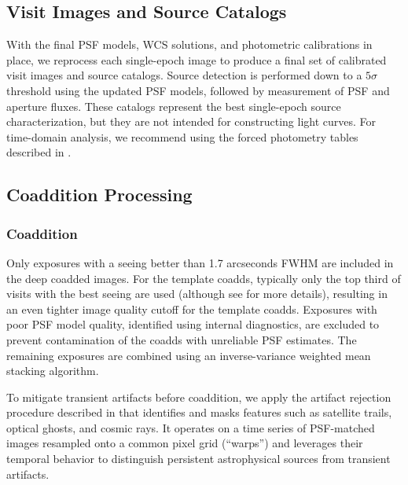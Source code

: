 \subsection{Visit Images and Source Catalogs}
\label{sssec:visit_images_source_catalogs}
With the final \gls{PSF} models, \gls{WCS} solutions, and photometric calibrations in place, we reprocess each single-epoch image to produce a final set of calibrated visit images and source catalogs.
Source detection is performed down to a $5\sigma$ threshold using the updated \gls{PSF} models, followed by measurement of \gls{PSF} and aperture fluxes.
These catalogs represent the best single-\gls{epoch} source characterization, but they are not intended for constructing light curves.
For time-domain analysis, we recommend using the \gls{forced photometry} tables described in .

\subsection{Coaddition Processing}
\label{ssec:coadd_processing}
\subsubsection{Coaddition}
\label{ssec:coaddition}
Only exposures with a \gls{seeing} better than 1.7 arcseconds FWHM are included in the deep coadded images. For the template coadds, typically only the top third of visits with the best \gls{seeing} are used (although see  for more details), resulting in an even tighter image quality cutoff for the template coadds. Exposures with poor \gls{PSF} model quality, identified using internal diagnostics, are excluded to prevent contamination of the coadds with unreliable \gls{PSF} estimates. The remaining exposures are combined using an inverse-variance weighted mean stacking \gls{algorithm}.

To mitigate transient artifacts before coaddition, we apply the artifact rejection procedure described in \cite{DMTN-080} that identifies and masks features such as satellite trails, optical ghosts, and cosmic rays.
It operates on a time series of \gls{PSF}-matched images resampled onto a common pixel grid (``warps'') and leverages their temporal behavior to distinguish persistent astrophysical sources from transient artifacts.

